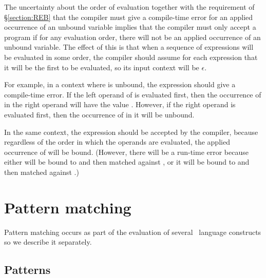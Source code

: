 The uncertainty about the order of evaluation together with the
requirement of \S\ref{section:REB} that the compiler must give a
compile-time error for an applied occurrence of an unbound variable
implies that the compiler must only accept a program if for any
evaluation order, there will not be an applied occurrence of an
unbound variable.  The effect of this is that when a sequence of
expressions will be evaluated in some order, the compiler should
assume for each expression that it will be the first to be evaluated,
so its input context will be $\epsilon$.

For example, in a context where  is unbound, the expression
 should give a compile-time error.  If the left operand
of \T{+} is evaluated first, then the occurrence of  in the right
operand will have the value .  However, if the right operand is
evaluated first, then the occurrence of  in it will be unbound.

In the same context, the expression  should be
accepted by the compiler, because regardless of the order in which the
operands are evaluated, the applied occurrence of  will be bound.
(However, there will be a run-time error because either  will be
bound to  and then matched against , or it will be bound to
 and then matched against .)
\fi
{}

\section{Pattern matching}

\label{section:pattern-matching}

Pattern matching occurs as part of the evaluation of several \Erlang\
language constructs so we describe it separately.

\subsection{Patterns}

